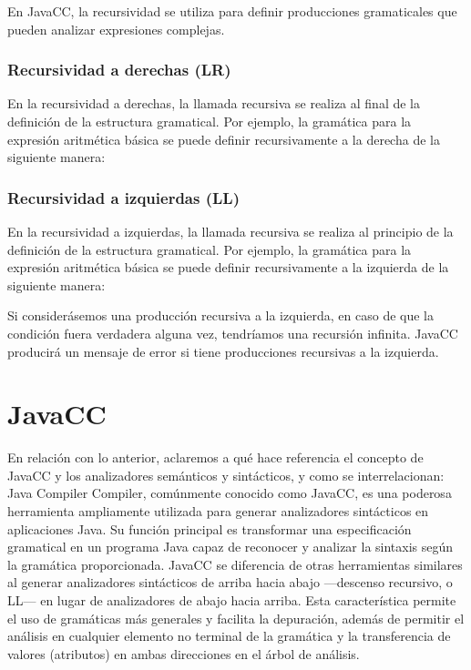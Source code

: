 En JavaCC, la recursividad se utiliza para definir producciones gramaticales que pueden analizar expresiones complejas.

\subsubsection{Recursividad a derechas (LR)}
\noindent En la recursividad a derechas, la llamada recursiva se realiza al final de la definición de la estructura gramatical. Por ejemplo, la gramática para la expresión aritmética básica se puede definir recursivamente a la derecha de la siguiente manera:

\lstset{inputencoding=utf8/latin1}


\subsubsection{Recursividad a izquierdas (LL)}

\noindent En la recursividad a izquierdas, la llamada recursiva se realiza al principio de la definición de la estructura gramatical. Por ejemplo, la gramática para la expresión aritmética básica se puede definir recursivamente a la izquierda de la siguiente manera:

\lstset{inputencoding=utf8/latin1}




Si considerásemos una producción recursiva a la izquierda, en caso de que la  condición fuera verdadera alguna vez, tendríamos una recursión infinita.
JavaCC producirá un mensaje de error si tiene producciones recursivas a la izquierda.

\section{JavaCC}
\noindent En relación con lo anterior, aclaremos a qué hace referencia el concepto de JavaCC y los analizadores semánticos y sintácticos, y como se interrelacionan:
Java Compiler Compiler, comúnmente conocido como JavaCC, es una poderosa herramienta ampliamente utilizada para generar analizadores sintácticos en aplicaciones Java. Su función principal es transformar una especificación gramatical en un programa Java capaz de reconocer y analizar la sintaxis según la gramática proporcionada.
JavaCC se diferencia de otras herramientas similares al generar analizadores sintácticos de arriba hacia abajo ---descenso recursivo, o LL--- en lugar de analizadores de abajo hacia arriba. Esta característica permite el uso de gramáticas más generales y facilita la depuración, además de permitir el análisis en cualquier elemento no terminal de la gramática y la transferencia de valores (atributos) en ambas direcciones en el árbol de análisis.

